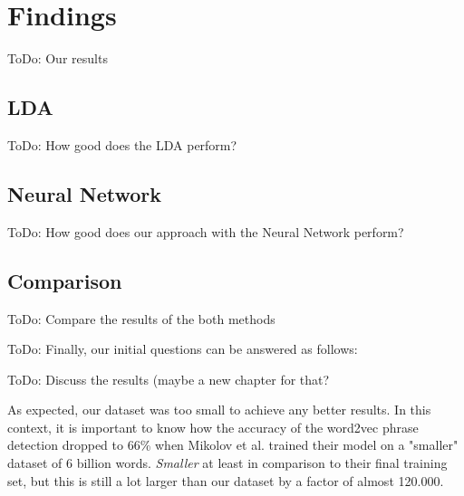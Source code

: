 \section{Findings} %
\label{sec:findings}

\colorbox{yellow!30}{ToDo:} Our results

\subsection{LDA} %
\label{sub:findings_lda}

\colorbox{yellow!30}{ToDo:} How good does the LDA perform?

\subsection{Neural Network} %
\label{sub:findings_nn}

\colorbox{yellow!30}{ToDo:} How good does our approach with the Neural Network perform?

\subsection{Comparison} %
\label{sub:findings_comparison}

\colorbox{yellow!30}{ToDo:} Compare the results of the both methods


\colorbox{yellow!30}{ToDo:} Finally, our initial questions can be answered as follows:

\colorbox{yellow!30}{ToDo:} Discuss the results (maybe a new chapter for that?


As expected, our dataset was too small to achieve any better results. In this context, it is important to know how the accuracy of the word2vec phrase detection dropped to 66\% when Mikolov et al. trained their model on a "smaller" dataset of 6 billion words\cite[p7]{mikolov_distributed_2013}. \emph{Smaller} at least in comparison to their final training set, but this is still a lot larger than our dataset by a factor of almost 120.000.


